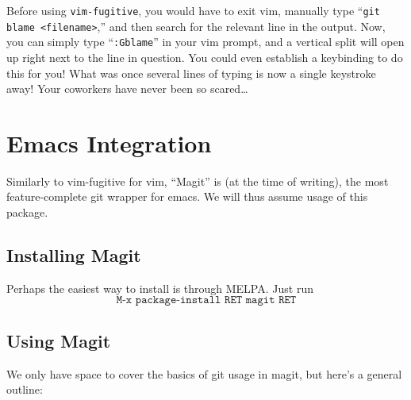 \documentclass[12pt]{report}
\begin{document}
Before using \texttt{vim-fugitive}, you would have to exit vim,
manually type “\texttt{git blame <filename>},” and then search for the
relevant line in the output. Now, you can simply type
“\texttt{:Gblame}” in your vim prompt, and a vertical split will open
up right next to the line in question. You could even establish a
keybinding to do this for you! What was once several lines of typing
is now a single keystroke away! Your coworkers have never been so
scared\ldots

\chapter{Emacs Integration}

Similarly to vim-fugitive for vim, “Magit” is (at the time of
writing), the most feature-complete git wrapper for emacs. We will
thus assume usage of this package.

\section{Installing Magit}
Perhaps the easiest way to install is through MELPA. Just run
\[
  \texttt{M-x package-install RET magit RET}
\]

\section{Using Magit}
We only have space to cover the basics of git usage in magit, but
here’s a general outline:
\end{document}
